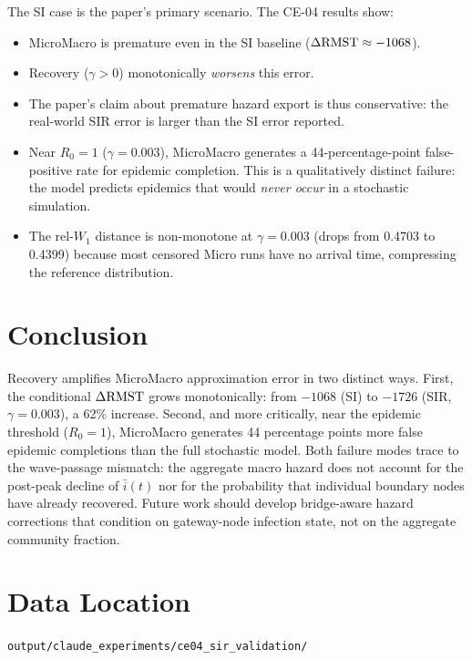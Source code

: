 \documentclass[11pt,a4paper]{article}
\begin{document}
The SI case is the paper's primary scenario.  The CE-04 results show:
\begin{itemize}
  \item MicroMacro is premature even in the SI baseline ($\Delta\mathrm{RMST} \approx -1068$).
  \item Recovery ($\gamma > 0$) monotonically \emph{worsens} this error.
  \item The paper's claim about premature hazard export is thus conservative:
        the real-world SIR error is larger than the SI error reported.
  \item Near $R_0 = 1$ ($\gamma = 0.003$), MicroMacro generates a
        44-percentage-point false-positive rate for epidemic completion.
        This is a qualitatively distinct failure: the model predicts
        epidemics that would \emph{never occur} in a stochastic simulation.
  \item The rel-$W_1$ distance is non-monotone at $\gamma = 0.003$
        (drops from 0.4703 to 0.4399) because most censored Micro runs
        have no arrival time, compressing the reference distribution.
\end{itemize}

\section{Conclusion}

Recovery amplifies MicroMacro approximation error in two distinct ways.
First, the conditional $\Delta\mathrm{RMST}$ grows monotonically: from $-1068$ (SI) to
$-1726$ (SIR, $\gamma=0.003$), a 62\% increase.
Second, and more critically, near the epidemic threshold ($R_0=1$),
MicroMacro generates 44 percentage points more false epidemic completions
than the full stochastic model.
Both failure modes trace to the wave-passage mismatch: the aggregate
macro hazard does not account for the post-peak decline of $\bar{i}(t)$
nor for the probability that individual boundary nodes have already recovered.
Future work should develop bridge-aware hazard corrections that condition
on gateway-node infection state, not on the aggregate community fraction.

\section*{Data Location}
\texttt{output/claude\_experiments/ce04\_sir\_validation/}
\end{document}
